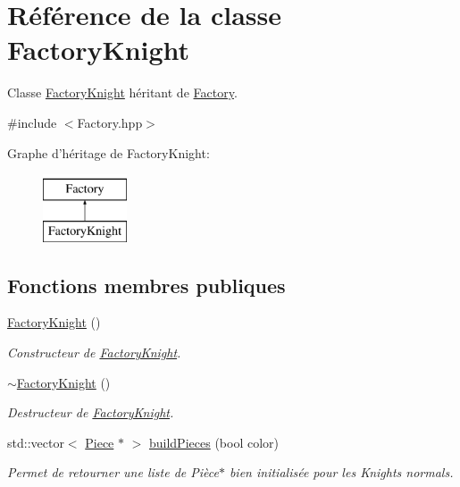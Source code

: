 \hypertarget{class_factory_knight}{\section{Référence de la classe Factory\-Knight}
\label{class_factory_knight}
}


Classe \hyperlink{class_factory_knight}{Factory\-Knight} héritant de \hyperlink{class_factory}{Factory}.  




{\ttfamily \#include $<$Factory.\-hpp$>$}

Graphe d'héritage de Factory\-Knight\-:\begin{figure}[H]
\begin{center}
\leavevmode
\includegraphics[height=2.000000cm]{class_factory_knight}
\end{center}
\end{figure}
\subsection*{Fonctions membres publiques}
\begin{DoxyCompactItemize}
\item 
\hyperlink{class_factory_knight_a4c3de6c385f4b3d02286e39cdbf99136}{Factory\-Knight} ()
\begin{DoxyCompactList}\small\item\em Constructeur de \hyperlink{class_factory_knight}{Factory\-Knight}. \end{DoxyCompactList}\item 
\hyperlink{class_factory_knight_a40846bdf0be3fb8ecbcb50df3c4a7f61}{$\sim$\-Factory\-Knight} ()
\begin{DoxyCompactList}\small\item\em Destructeur de \hyperlink{class_factory_knight}{Factory\-Knight}. \end{DoxyCompactList}\item 
std\-::vector$<$ \hyperlink{class_piece}{Piece} $\ast$ $>$ \hyperlink{class_factory_knight_a25af606063189d96698aae45b1bfc1b9}{build\-Pieces} (bool color)
\begin{DoxyCompactList}\small\item\em Permet de retourner une liste de Pièce$\ast$ bien initialisée pour les Knights normals. \end{DoxyCompactList}\end{DoxyCompactItemize}


